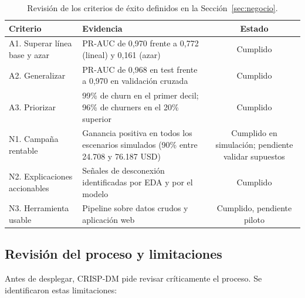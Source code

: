 \documentclass[11pt,a4paper]{article}
\begin{document}
\begin{table}[H]
  \centering
  \caption{Revisión de los criterios de éxito definidos en la Sección~\ref{sec:negocio}.}
  \label{tab:cumplimiento}
  \small
  \begin{tabularx}{\textwidth}{lYc}
    \toprule
    Criterio & Evidencia & Estado \\
    \midrule
    A1. Superar línea base y azar & PR-AUC de 0,970 frente a 0,772 (lineal) y 0,161 (azar) & Cumplido \\
    A2. Generalizar & PR-AUC de 0,968 en test frente a 0,970 en validación cruzada & Cumplido \\
    A3. Priorizar & 99\% de churn en el primer decil; 96\% de churners en el 20\% superior & Cumplido \\
    N1. Campaña rentable & Ganancia positiva en todos los escenarios simulados (90\% entre 24.708 y 76.187 USD) & Cumplido en simulación; pendiente validar supuestos \\
    N2. Explicaciones accionables & Señales de desconexión identificadas por EDA y por el modelo & Cumplido \\
    N3. Herramienta usable & Pipeline sobre datos crudos y aplicación web & Cumplido, pendiente piloto \\
    \bottomrule
  \end{tabularx}
\end{table}

\subsection{Revisión del proceso y limitaciones}

Antes de desplegar, CRISP-DM pide revisar críticamente el proceso. Se identificaron estas limitaciones:
\end{document}
